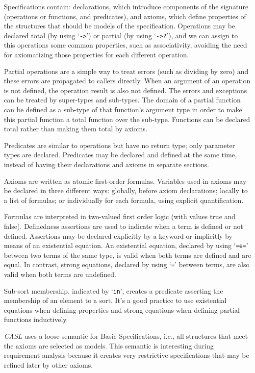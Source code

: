 \documentclass[12pt,twoside]{article}
\numberwithin{spec}{subsection}
\numberwithin{proof}{subsection}
\numberwithin{figure}{subsection}
\numberwithin{code}{subsection}
\begin{document}
Specifications contain: declarations, which introduce components of the signature (operations or functions, and predicates), and axioms, which define properties of the structures that should be models of the specification. Operations may be declared total (by using `\verb.->.') or partial (by using `\verb.->?.'), and we can assign to this operations some common properties, such as associativity, avoiding the need for axiomatizing those properties for each different operation.

Partial operations are a simple way to treat errors (such as dividing by zero) and these errors are propagated to callers directly. When an argument of an operation is not defined, the operation result is also not defined. The errors and exceptions can be treated by super-types and sub-types. The domain of a partial function can be defined as a sub-type of that function's argument type in order to make this partial function a total function over the sub-type. Functions can be declared total rather than making them total by axioms.

Predicates are similar to operations but have no return type; only parameter types are declared. Predicates may be declared and defined at the same time, instead of having their declarations and axioms in separate sections.

Axioms are written as atomic first-order formulas. Variables used in axioms may be declared in three different ways: globally, before axiom declarations; locally to a list of formulas; or individually for each formula, using explicit quantification.

Formulas are interpreted in two-valued first order logic (with values true and false). Definedness assertions are used to indicate when a term is defined or not defined. Assertions may be declared explicitly by a keyword or implicitly by means of an existential equation. An existential equation, declared by using `\verb.=e=.' between two terms of the same type, is valid when both terms are defined and are equal. In contrast, strong equations, declared by using `\verb.=.' between terms, are also valid when both terms are undefined.

Sub-sort membership, indicated by `\verb.in.', creates a predicate asserting the membership of an element to a sort. It's a good practice to use existential equations when defining properties and strong equations when defining partial functions inductively.

\textit{CASL} uses a loose semantic for Basic Specifications, i.e., all structures that meet the axioms are selected as models. This semantic is interesting during requirement analysis because it creates very restrictive specifications that may be refined later by other axioms.
\end{document}
